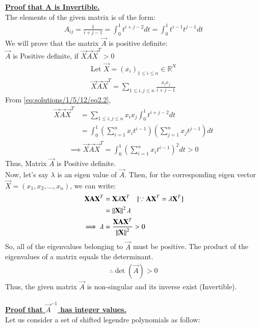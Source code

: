 \underline{\textbf{Proof that A is Invertible.}}\\
The elements of the given matrix is of the form:
\begin{align}
    A_{ij} = \frac{1}{i+j-1}= \int_{0}^{1}t^{i+j-2}dt= \int_{0}^{1}t^{i-1}t^{j-1}dt \label{eq:solutions/1/5/12/eq2.2}
\end{align}
We will prove that the matrix $\vec{A}$ is positive definite:\\
$\vec{A}$ is Positive definite, if $\vec{X}\Vec{A}\vec{X}^T>0$
\begin{align}
   \text{Let } \vec{X}=(x_i)_{1\leq i\leq n} \in \mathbb{R}^N\\
   \vec{X}\Vec{A}\vec{X}^T=\sum_{1\leq i,j\leq n}\frac{x_ix_j}{i+j-1}
\end{align}
From \eqref{eq:solutions/1/5/12/eq2.2},
\begin{align}
   \vec{X}\Vec{A}\vec{X}^T &=\sum_{1\leq i,j\leq n}x_ix_j\int_0^1t^{i+j-2}dt\\
   &=\int_0^1\left(\sum_{i=1}^nx_it^{i-1}\right)\left(\sum_{j=1}^nx_jt^{j-1}\right)dt
\end{align}
\begin{align}
       \implies \vec{X}\Vec{A}\vec{X}^T=\int_0^1\left(\sum_{i=1}^nx_it^{i-1}\right)^2dt>0
\end{align}
Thus, Matrix $\vec{A}$ is Positive definite. \\
Now, let's say $\lambda$ is an eigen value of $\vec{A}$. Then, for the corresponding eigen vector $\vec{X}=(x_1,x_2,...,x_n)$, we can write:
\begin{align}
       \vec{X}\Vec{A}\vec{X}^T&=\vec{X}\lambda\vec{X}^T \quad [\because  \Vec{A}\vec{X}^T=\lambda\vec{X}^T]\\
       &=\norm{\vec{X}}^2\lambda\\
       \implies \lambda&=\frac{\vec{X}\Vec{A}\vec{X}^T}{\norm{\vec{X}}^2}>0
\end{align}
So, all of the eigenvalues belonging to  $\vec{A}$ must be positive. The product of the eigenvalues of a matrix equals the determinant.
\begin{align}
    \boxed{\therefore \det({\vec{A}})>0}
\end{align}
Thus, the given matrix $\vec{A}$ is non-singular and its inverse exist (Invertible).\\ \\
\underline{\textbf{Proof that $\vec{A}^{-1}$ has integer values.}}\\
Let us consider a set of shifted legendre polynomials as follow:
